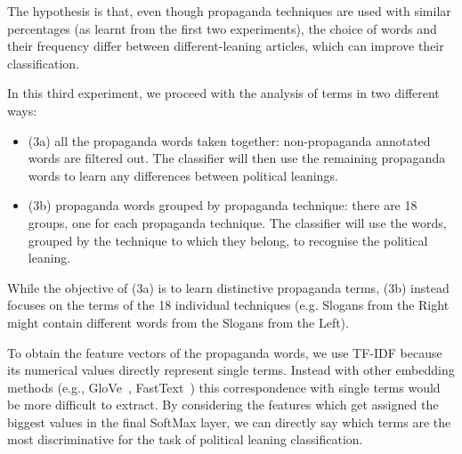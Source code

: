 The hypothesis is that, even though propaganda techniques are used with similar percentages (as learnt from the first two experiments), the choice of words and their frequency differ between different-leaning articles, which can improve their classification. 


In this third experiment, we proceed with the analysis of terms in two different ways:
\begin{itemize}
    \item (3a) all the propaganda words taken together: non-propaganda annotated words are filtered out. The classifier will then use the remaining propaganda words to learn any differences between political leanings. 
    \item (3b) propaganda words grouped by propaganda technique: there are 18 groups, one for each propaganda technique. The classifier will use the words, grouped by the technique to which they belong, to recognise the political leaning.
\end{itemize}

While the objective of (3a) is to learn distinctive propaganda terms, (3b) instead focuses on the terms of the 18 individual techniques (e.g. Slogans from the Right might contain different words from the Slogans from the Left).

To obtain the feature vectors of the propaganda words, we use TF-IDF 
because its numerical values directly represent single terms. Instead with other embedding methods (e.g., GloVe~\cite{pennington2014glove}, FastText~\cite{joulin2016fasttext}) this correspondence with single terms would be more difficult to extract. By considering the features which get assigned the biggest values in the final SoftMax layer, we can directly say which terms are the most discriminative for the task of political leaning classification.

